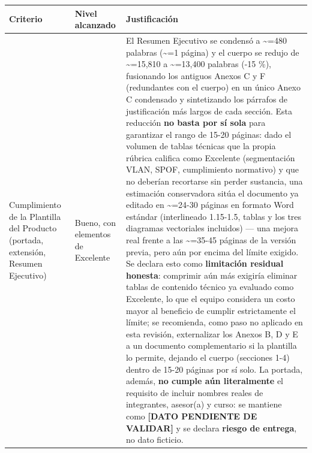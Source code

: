 \documentclass[11pt,a4paper]{article}
\begin{document}
{\small
\begin{longtable}[]{@{}
  >{\raggedright\arraybackslash}p{}
  >{\raggedright\arraybackslash}p{}
  >{\raggedright\arraybackslash}p{}@{}}
\toprule\noalign{}
\begin{minipage}[b]{\linewidth}\raggedright
Criterio
\end{minipage} & \begin{minipage}[b]{\linewidth}\raggedright
Nivel alcanzado
\end{minipage} & \begin{minipage}[b]{\linewidth}\raggedright
Justificación
\end{minipage} \\
\midrule\noalign{}
\endhead
\bottomrule\noalign{}
\endlastfoot
Cumplimiento de la Plantilla del Producto (portada, extensión, Resumen Ejecutivo) & Bueno, con elementos de Excelente & El Resumen Ejecutivo se condensó a \textasciitilde=480 palabras (\textasciitilde=1 página) y el cuerpo se redujo de \textasciitilde=15,810 a \textasciitilde=13,400 palabras (-15 \%), fusionando los antiguos Anexos C y F (redundantes con el cuerpo) en un único Anexo C condensado y sintetizando los párrafos de justificación más largos de cada sección. Esta reducción \textbf{no basta por sí sola} para garantizar el rango de 15-20 páginas: dado el volumen de tablas técnicas que la propia rúbrica califica como Excelente (segmentación VLAN, SPOF, cumplimiento normativo) y que no deberían recortarse sin perder sustancia, una estimación conservadora sitúa el documento ya editado en \textasciitilde=24-30 páginas en formato Word estándar (interlineado 1.15-1.5, tablas y los tres diagramas vectoriales incluidos) --- una mejora real frente a las \textasciitilde=35-45 páginas de la versión previa, pero aún por encima del límite exigido. Se declara esto como \textbf{limitación residual honesta}: comprimir aún más exigiría eliminar tablas de contenido técnico ya evaluado como Excelente, lo que el equipo considera un costo mayor al beneficio de cumplir estrictamente el límite; se recomienda, como paso no aplicado en esta revisión, externalizar los Anexos B, D y E a un documento complementario si la plantilla lo permite, dejando el cuerpo (secciones 1-4) dentro de 15-20 páginas por sí solo. La portada, además, \textbf{no cumple aún literalmente} el requisito de incluir nombres reales de integrantes, asesor(a) y curso: se mantiene como \textbf{{[}DATO PENDIENTE DE VALIDAR{]}} y se declara \textbf{riesgo de entrega}, no dato ficticio. \\

\end{longtable}}
\end{document}
